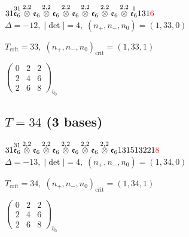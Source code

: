 \documentclass[10pt]{article}
\begin{document}
\smallskip

$31\overset{31}{\mathfrak{e}_6}\overset{2,2}{\otimes}\mathfrak{e}_6\overset{2,2}{\otimes}\mathfrak{e}_6\overset{2,2}{\otimes}\mathfrak{e}_6\overset{2,2}{\otimes}\mathfrak{e}_6\overset{2,2}{\otimes}\mathfrak{e}_6\overset{2,2}{\otimes}\overset{1}{\mathfrak{e}_6}131\textcolor{red}{6}$ \quad $\Delta=-12,\; |\det|=4,\; (n_+,n_-,n_0)=(1,33,0)$

\hspace{1em}$T_{\text{crit}}=33,\; (n_+,n_-,n_0)_{\text{crit}}=(1,33,1)$

\hspace{2em}$\left(\begin{smallmatrix}0 & 2 & 2 \\ 2 & 4 & 6 \\ 2 & 6 & 8\end{smallmatrix}\right)_{\!b_0}$


\subsection*{$T = 34$ \quad (3 bases)}
\smallskip

$31\overset{31}{\mathfrak{e}_6}\overset{2,2}{\otimes}\mathfrak{e}_6\overset{2,2}{\otimes}\mathfrak{e}_6\overset{2,2}{\otimes}\mathfrak{e}_6\overset{2,2}{\otimes}\mathfrak{e}_6\overset{2,2}{\otimes}\mathfrak{e}_6131513221\textcolor{red}{8}$ \quad $\Delta=-13,\; |\det|=4,\; (n_+,n_-,n_0)=(1,34,0)$

\hspace{1em}$T_{\text{crit}}=34,\; (n_+,n_-,n_0)_{\text{crit}}=(1,34,1)$

\hspace{2em}$\left(\begin{smallmatrix}0 & 2 & 2 \\ 2 & 4 & 6 \\ 2 & 6 & 8\end{smallmatrix}\right)_{\!b_0}$

\smallskip
\end{document}
